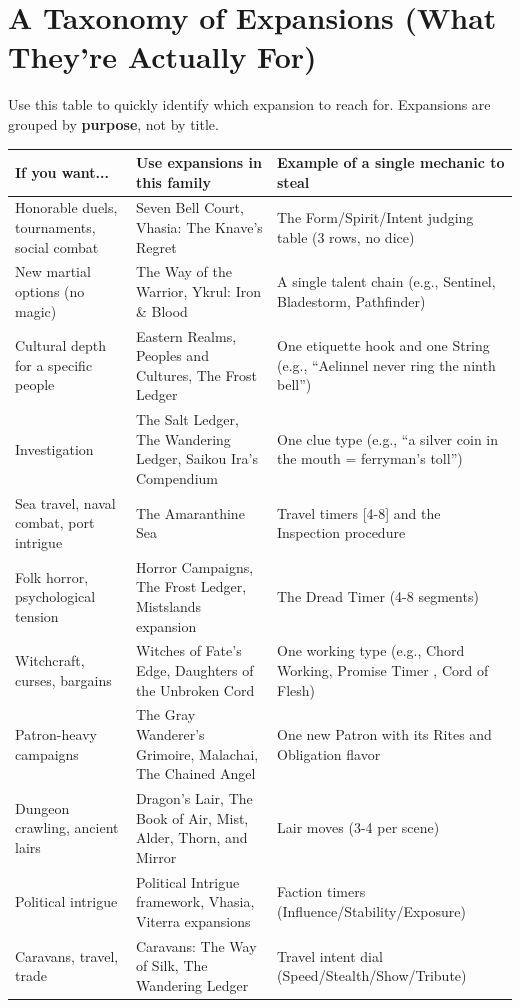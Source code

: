 \section{A Taxonomy of Expansions (What They're Actually For)}

Use this table to quickly identify which expansion to reach for. Expansions are grouped by \textbf{purpose}, not by title.

\begin{longtable}{p{3.5cm}|p{3.5cm}|p{6cm}}
\hline
\textbf{If you want...} & \textbf{Use expansions in this family} & \textbf{Example of a single mechanic to steal} \\
\hline
Honorable duels, tournaments, social combat & Seven Bell Court, Vhasia: The Knave's Regret & The Form/Spirit/Intent judging table (3 rows, no dice) \\
\hline
New martial options (no magic) & The Way of the Warrior, Ykrul: Iron \& Blood & A single talent chain (e.g., Sentinel, Bladestorm, Pathfinder) \\
\hline
Cultural depth for a specific people & Eastern Realms, Peoples and Cultures, The Frost Ledger & One etiquette hook and one String (e.g., ``Aelinnel never ring the ninth bell'') \\
\hline
Investigation & The Salt Ledger, The Wandering Ledger, Saikou Ira's Compendium & One clue type (e.g., ``a silver coin in the mouth = ferryman's toll'') \\
\hline
Sea travel, naval combat, port intrigue & The Amaranthine Sea & Travel timers [4-8] and the Inspection procedure \\
\hline
Folk horror, psychological tension & Horror Campaigns, The Frost Ledger, Mistslands expansion & The Dread Timer (4-8 segments) \\
\hline
Witchcraft, curses, bargains & Witches of Fate's Edge, Daughters of the Unbroken Cord & One working type (e.g., Chord Working, Promise Timer , Cord of Flesh) \\
\hline
Patron-heavy campaigns & The Gray Wanderer's Grimoire, Malachai, The Chained Angel & One new Patron with its Rites and Obligation flavor \\
\hline
Dungeon crawling, ancient lairs & Dragon's Lair, The Book of Air, Mist, Alder, Thorn, and Mirror & Lair moves (3-4 per scene) \\
\hline
Political intrigue & Political Intrigue framework, Vhasia, Viterra expansions & Faction timers (Influence/Stability/Exposure) \\
\hline
Caravans, travel, trade & Caravans: The Way of Silk, The Wandering Ledger & Travel intent dial (Speed/Stealth/Show/Tribute) \\
\hline
\end{longtable}


